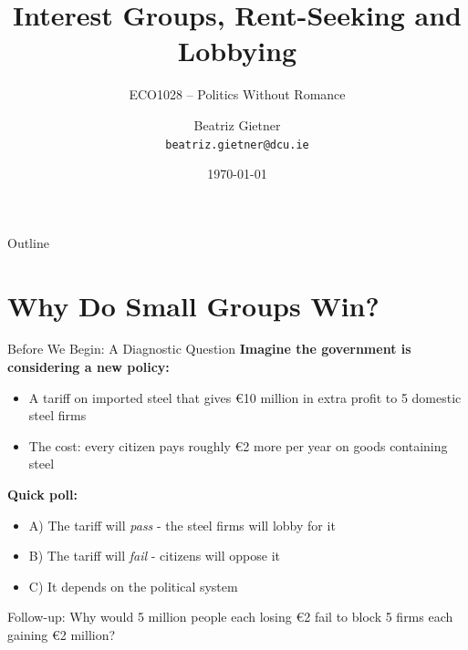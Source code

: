 \documentclass[10pt]{beamer}
\title{Interest Groups, Rent-Seeking and Lobbying}
\subtitle{ECO1028 -- Politics Without Romance}
\author{Beatriz Gietner\\
\texttt{beatriz.gietner@dcu.ie}}
\date{\today}
\begin{document}
\maketitle

\begin{frame}{Outline}
\tableofcontents
\end{frame}

\section{Why Do Small Groups Win?}

\begin{frame}{Before We Begin: A Diagnostic Question}
\textbf{Imagine the government is considering a new policy:}

\begin{itemize}
\item A tariff on imported steel that gives \alert{\euro 10 million} in extra profit to 5 domestic steel firms
\item The cost: every citizen pays roughly \alert{\euro 2 more} per year on goods containing steel
\end{itemize}

\vspace{0.2cm}
\textbf{Quick poll:}
\begin{itemize}
\item A) The tariff will \emph{pass} - the steel firms will lobby for it
\item B) The tariff will \emph{fail} - citizens will oppose it
\item C) It depends on the political system
\end{itemize}

\vspace{0.2cm}
\alert{Follow-up:} Why would 5 million people each losing \euro 2 fail to block 5 firms each gaining \euro 2 million?
\end{frame}
\end{document}
